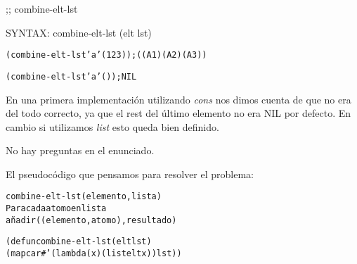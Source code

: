 
\begin{aibox}{\function}
;; combine-elt-lst

SYNTAX: combine-elt-lst (elt lst)
\end{aibox}

\begin{aibox}{\examples}

\begin{alltt}
(combine-elt-lst 'a '(1 2 3)); ((A 1) (A 2) (A 3))

(combine-elt-lst 'a '()); NIL
\end{alltt}

\end{aibox}

\begin{aibox}{\comments}
En una primera implementación utilizando \emph{cons} nos dimos cuenta de que no era del todo correcto, ya que el rest del último elemento no era NIL por defecto. En cambio si utilizamos \emph{list} esto queda bien definido.
\end{aibox}
\begin{aibox}{\answers}
No hay preguntas en el enunciado.
\end{aibox}
\begin{aibox}{\othercomments}

\end{aibox}
\begin{aibox}{\pseudocode}
El pseudocódigo que pensamos para resolver el problema:

\begin{alltt}
combine-elt-lst (elemento,lista)
    Para cada atomo en lista
        añadir ((elemento,atomo),resultado)
\end{alltt}
\end{aibox}
\begin{aibox}{\code}

\begin{alltt}

(defun combine-elt-lst (elt lst)
            (mapcar #'(lambda (x) (list elt x)) lst))

\end{alltt}
\end{aibox}
